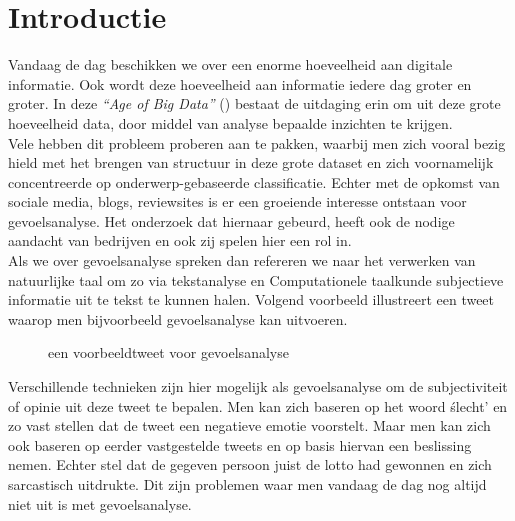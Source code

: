 \chapter{Introductie}\label{introductie}

Vandaag de dag beschikken we over een enorme hoeveelheid aan digitale informatie. Ook wordt deze hoeveelheid aan informatie iedere dag groter en groter. 
In deze \textit{``Age of Big Data''} (\cite{lohr2012age}) bestaat de uitdaging erin om uit deze grote hoeveelheid data, door middel van analyse bepaalde inzichten te krijgen.
\\
Vele hebben dit probleem proberen aan te pakken, waarbij men zich vooral bezig hield met het brengen van structuur in deze grote dataset en zich voornamelijk concentreerde op onderwerp-gebaseerde classificatie. Echter met de opkomst van sociale media, blogs, reviewsites is er een groeiende interesse ontstaan voor gevoelsanalyse. Het onderzoek dat hiernaar gebeurd, heeft ook de nodige aandacht van bedrijven en ook zij spelen hier een rol in.\\
Als we over gevoelsanalyse spreken dan refereren we naar het verwerken van natuurlijke taal  om zo via tekstanalyse en Computationele taalkunde subjectieve informatie uit te tekst te kunnen halen. Volgend voorbeeld illustreert een tweet waarop men bijvoorbeeld gevoelsanalyse kan uitvoeren.\\

\begin{figure}[h]%
    \centering
    \caption{een voorbeeldtweet voor gevoelsanalyse}%
\end{figure}
\newline

Verschillende technieken zijn hier mogelijk  als gevoelsanalyse om de subjectiviteit of opinie uit deze tweet te bepalen. Men kan zich baseren op het woord \'slecht' en zo vast stellen dat de tweet een negatieve emotie voorstelt. Maar men kan zich ook baseren op eerder vastgestelde tweets en op basis hiervan een beslissing nemen. Echter stel dat de gegeven persoon juist de lotto had gewonnen en zich sarcastisch uitdrukte. Dit zijn problemen waar men vandaag de dag nog altijd niet uit is met gevoelsanalyse.\\ 

